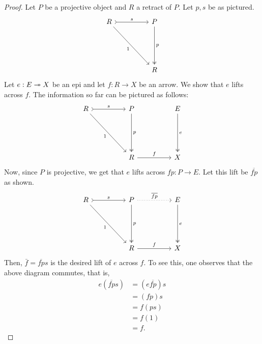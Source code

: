 \begin{proof} 
	Let $P$ be a projective object and $R$ a retract of $P.$ Let $p, s$ be as pictured.
	\begin{equation*} 
		\begin{tikzcd}
		R \arrow[rr, "s", tail] \arrow[rrddd, "1"'] &  & P \arrow[ddd, "p", two heads] \\&&\\&&\\&&R                            
		\end{tikzcd}
	\end{equation*}
	Let $e: E \twoheadrightarrow X$ be an epi and let $f:R\to X$ be an arrow. We show that $e$ lifts across $f.$ The information so far can be pictured as follows:
	\begin{equation*} 
		\begin{tikzcd}
			R \arrow[rr, "s", tail] \arrow[rrddd, "1"'] &%
			& P \arrow[ddd, "p", two heads] &  & E \arrow[ddd, "e", two heads] \\
			&&&&\\&&&&\\&&R \arrow[rr, "f"]&&X
		\end{tikzcd}	
	\end{equation*}
	Now, since $P$ is projective, we get that $e$ lifts across $fp:P\to E.$ Let this lift be $\overline{fp}$ as shown.
	\begin{equation*} 
		\begin{tikzcd}
			R \arrow[rr, "s", tail] \arrow[rrddd, "1"'] &%
			& P \arrow[ddd, "p", two heads] \arrow[rr, "\overline{fp}", dotted]  &  & E \arrow[ddd, "e", two heads] \\
			&&&&\\&&&&\\&&R \arrow[rr, "f"]&&X
		\end{tikzcd}	
	\end{equation*}
	Then, $\bar{f} = \overline{fp}s$ is the desired lift of $e$ across $f.$ To see this, one observes that the above diagram commutes, that is,
	\begin{align*} 
		e(\overline{fp}s) &= (e \overline{fp})s\\
		&= (fp)s\\
		&= f(ps)\\
		&= f(1)\\
		&= f.
	\end{align*}
\end{proof}
%
%
